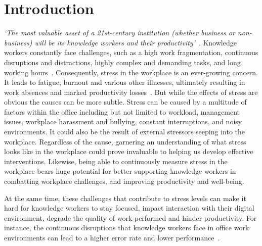 \section{Introduction}
\textit{`The most valuable asset of a 21st-century institution (whether 
business or non-business) will be its knowledge workers and their 
productivity'}~\cite{drucker1999knowledge}. Knowledge workers constantly face 
challenges, such as a high work fragmentation, continuous disruptions and 
distractions, highly complex and demanding tasks, and long working 
hours~\cite{gonzalez2004constant,mark2008cost,czerwinski04diary}. 
Consequently, stress in the workplace is an ever-growing concern. It leads to 
fatigue, burnout and various other illnesses, ultimately resulting in work 
absences and marked productivity 
losses~\cite{hockey1997stress,setz2010stress,wrs2010}.
But while the effects of stress are obvious the causes can be more subtle. Stress can be caused by
a multitude of factors within the office including but not limited to workload, management issues, workplace harassment and bullying,
constant interruptions, and noisy environments. It could also be the result of external stressors seeping into the workplace.
Regardless of the cause, garnering an understanding of what stress looks like in the workplace could
prove invaluable to helping us develop effective interventions.
Likewise, being able to continuously measure stress in the workplace bears huge potential for better supporting 
knowledge workers in combatting workplace challenges, and improving productivity 
and well-being.

At the same time, these 
challenges that contribute to stress levels can make it hard for knowledge workers to stay focused, impact interaction with their digital environment, degrade the quality of work performed and hinder productivity.
For instance, the continuous disruptions that knowledge workers face in office work environments can lead to a higher error rate and lower 
performance~\cite{bailey2001effects,mark2008cost}.

